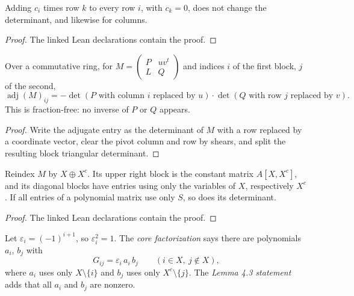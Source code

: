 \begin{lemma}
\label{lem:fin-shear}
\leanok
Adding $c_i$ times row $k$ to every row $i$, with $c_k=0$, does not change the
determinant, and likewise for columns.
\end{lemma}
\begin{proof}
\leanok
The linked Lean declarations contain the proof.
\end{proof}

\begin{lemma}
\label{lem:fin-block-adj}
\leanok
{}
Over a commutative ring, for
$M=\left(\begin{smallmatrix}P&uv^t\\L&Q\end{smallmatrix}\right)$ and indices $i$ of the
first block, $j$ of the second,
\[ \operatorname{adj}(M)_{ij}=-\det(P\text{ with column }i\text{ replaced by }u)\cdot
   \det(Q\text{ with row }j\text{ replaced by }v). \]
This is fraction-free: no inverse of $P$ or $Q$ appears.
\end{lemma}
\begin{proof}
\leanok
Write the adjugate entry as the determinant of $M$ with a row replaced by a coordinate
vector, clear the pivot column and row by shears, and split the resulting block
triangular determinant.
\end{proof}

\begin{lemma}
\label{lem:fin-split}
\leanok
{}
Reindex $M$ by $X\oplus X^c$. Its upper right block is the constant matrix $A[X,X^c]$,
and its diagonal blocks have entries using only the variables of $X$, respectively $X^c$.
If all entries of a polynomial matrix use only $S$, so does its determinant.
\end{lemma}
\begin{proof}
\leanok
The linked Lean declarations contain the proof.
\end{proof}

\begin{definition}
\label{def:fin-statement}
\leanok
{}
Let $\varepsilon_i=(-1)^{i+1}$, so $\varepsilon_i^2=1$. The \emph{core factorization} says
there are polynomials $a_i$, $b_j$ with
\[ G_{ij}=\varepsilon_i\,a_i\,b_j\qquad(i\in X,\ j\notin X), \]
where $a_i$ uses only $X\setminus\{i\}$ and $b_j$ uses only $X^c\setminus\{j\}$.
The \emph{Lemma 4.3 statement} adds that all $a_i$ and $b_j$ are nonzero.
\end{definition}

